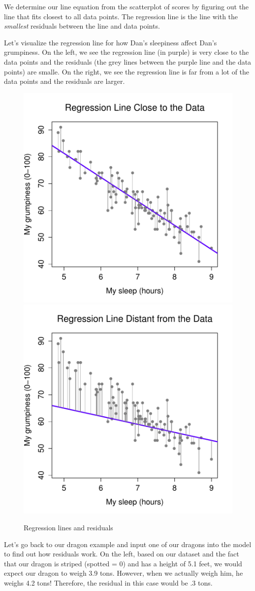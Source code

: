 \documentclass[
]{book}
\begin{document}
We determine our line equation from the scatterplot of scores by figuring out the line that fits closest to all data points. The regression line is the line with the \emph{smallest} residuals between the line and data points.

Let's visualize the regression line for how Dan's sleepiness affect Dan's grumpiness. On the left, we see the regression line (in purple) is very close to the data points and the residuals (the grey lines between the purple line and the data points) are smalle. On the right, we see the regression line is far from a lot of the data points and the residuals are larger.

\begin{figure}

{\centering \includegraphics[width=0.49\linewidth]{images/13-regression/good-regression-line} \includegraphics[width=0.49\linewidth]{images/13-regression/bad-regression-line} 

}

\caption{Regression lines and residuals}\label{fig:unnamed-chunk-3}
\end{figure}

Let's go back to our dragon example and input one of our dragons into the model to find out how residuals work. On the left, based on our dataset and the fact that our dragon is striped (spotted = 0) and has a height of 5.1 feet, we would expect our dragon to weigh 3.9 tons. However, when we actually weigh him, he weighs 4.2 tons! Therefore, the residual in this case would be .3 tons.
\end{document}
